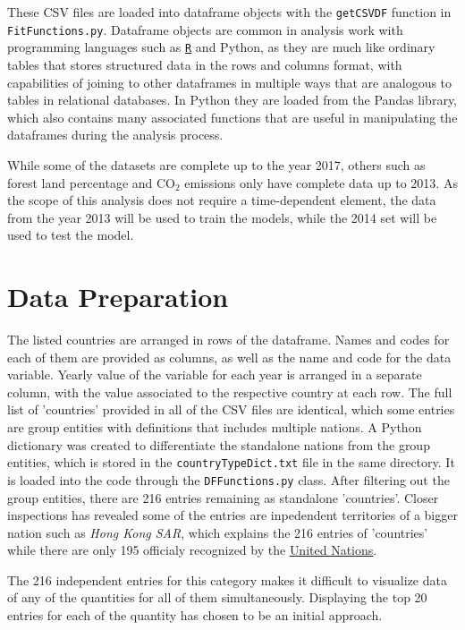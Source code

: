 \documentclass[11pt,a4paper,titlepage]{article}
\newcommand{\blankline}{\quad\pagebreak[2]}
\begin{document}
These CSV files are loaded into dataframe objects with the \texttt{getCSVDF} function in \texttt{FitFunctions.py}. Dataframe objects are common in analysis work with programming languages such as \href{https://www.r-project.org/}{\texttt{R}} and Python, as they are much like ordinary tables that stores structured data in the rows and columns format, with capabilities of joining to other dataframes in multiple ways that are analogous to tables in relational databases. In Python they are loaded from the Pandas library, which also contains many associated functions that are useful in manipulating the dataframes during the analysis process. 

While some of the datasets are complete up to the year 2017, others such as forest land percentage and CO$_{2}$ emissions only have complete data up to 2013. As the scope of this analysis does not require a time-dependent element, the data from the year 2013 will be used to train the models, while the 2014 set will be used to test the model.

\section{Data Preparation}

The listed countries are arranged in rows of the dataframe. Names and codes for each of them are provided as columns, as well as the name and code for the data variable. Yearly value of the variable for each year is arranged in a separate column, with the value associated to the respective country at each row. The full list of 'countries' provided in all of the CSV files are identical, which some entries are group entities with definitions that includes multiple nations. A Python dictionary was created to differentiate the standalone nations from the group entities, which is stored in the \texttt{countryTypeDict.txt} file in the same directory. It is loaded into the code through the \texttt{DFFunctions.py} class. After filtering out the group entities, there are 216 entries remaining as standalone 'countries'. Closer inspections has revealed some of the entries are inpedendent territories of a bigger nation such as \textit{Hong Kong SAR}, which explains the 216 entries of 'countries' while there are only 195 officialy recognized by the \href{http://www.un.org/en/index.html}{United Nations}.

\blankline

The 216 independent entries for this category makes it difficult to visualize data of any of the quantities for all of them simultaneously. Displaying the top 20 entries for each of the quantity has chosen to be an initial approach.
\end{document}
